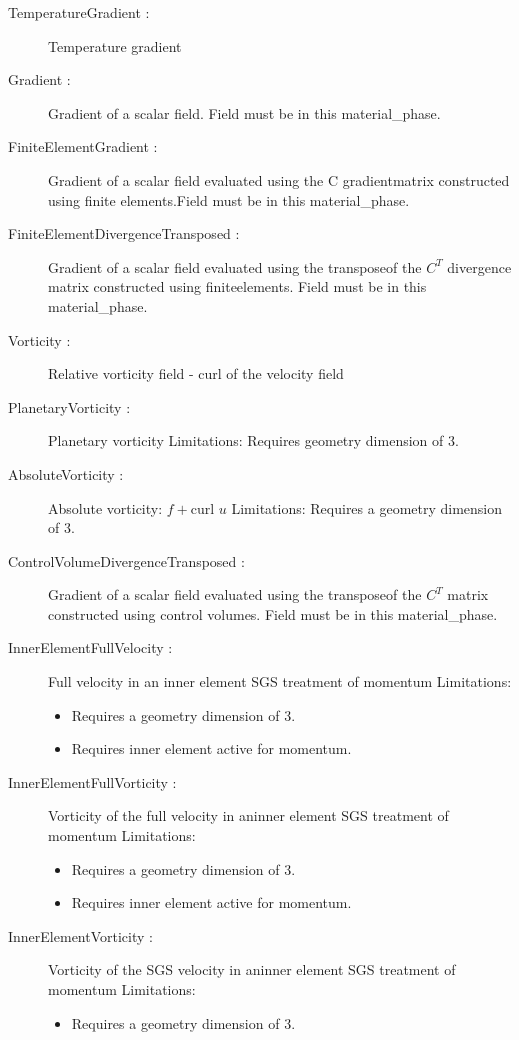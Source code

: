 \begin{description}

 \item[TemperatureGradient :] Temperature gradient    
 \item[Gradient :] Gradient of a scalar field. Field must be in this material\_phase.    
 \item[FiniteElementGradient :] Gradient of a scalar field evaluated using the C gradientmatrix constructed using finite elements.Field must be in this material\_phase.    
 \item[FiniteElementDivergenceTransposed :] Gradient of a scalar field evaluated using the transposeof the $C^T$ divergence matrix constructed using finiteelements. Field must be in this material\_phase.    
 \item[Vorticity :] Relative vorticity field - curl of the velocity field    
 \item[PlanetaryVorticity :] Planetary vorticity
	Limitations: Requires geometry dimension of 3.    
 \item[AbsoluteVorticity :] Absolute vorticity:  $f + \mbox{curl } u$ 
	Limitations: Requires a geometry dimension of 3.    
 \item[ControlVolumeDivergenceTransposed :] Gradient of a scalar field evaluated using the transposeof the $C^T$ matrix constructed using control volumes. Field must be in this material\_phase.    
 \item[InnerElementFullVelocity :] Full velocity in an inner element SGS treatment of momentum
	Limitations: \begin{itemize}
	\item Requires a geometry dimension of 3.
	\item Requires inner element active for momentum.
	\end{itemize}    
 \item[InnerElementFullVorticity :] Vorticity of the full velocity in aninner element SGS treatment of momentum
	Limitations: \begin{itemize}
	\item Requires a geometry dimension of 3.
	\item Requires inner element active for momentum.
	\end{itemize}     
 \item[InnerElementVorticity :] Vorticity of the SGS velocity in aninner element SGS treatment of momentum
	Limitations: \begin{itemize}
	\item Requires a geometry dimension of 3.

\end{itemize}
\end{description}
